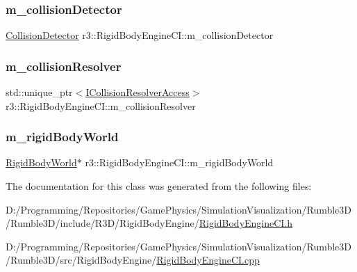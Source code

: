 \subsubsection{\texorpdfstring{m\+\_\+collision\+Detector}{m\_collisionDetector}}
{\footnotesize\ttfamily \mbox{\hyperlink{classr3_1_1_collision_detector}{Collision\+Detector}} r3\+::\+Rigid\+Body\+Engine\+C\+I\+::m\+\_\+collision\+Detector\hspace{0.3cm}{\ttfamily [protected]}}

\mbox{\label{classr3_1_1_rigid_body_engine_c_i_a27f09a82ab77919c2fb78869f6d3c035}} 
\subsubsection{\texorpdfstring{m\+\_\+collision\+Resolver}{m\_collisionResolver}}
{\footnotesize\ttfamily std\+::unique\+\_\+ptr$<$\mbox{\hyperlink{classr3_1_1_i_collision_resolver_access}{I\+Collision\+Resolver\+Access}}$>$ r3\+::\+Rigid\+Body\+Engine\+C\+I\+::m\+\_\+collision\+Resolver\hspace{0.3cm}{\ttfamily [protected]}}

\mbox{\label{classr3_1_1_rigid_body_engine_c_i_afd7ae3fcba8b88ec6c31f2df56aae3f6}} 
\subsubsection{\texorpdfstring{m\+\_\+rigid\+Body\+World}{m\_rigidBodyWorld}}
{\footnotesize\ttfamily \mbox{\hyperlink{classr3_1_1_rigid_body_world}{Rigid\+Body\+World}}$\ast$ r3\+::\+Rigid\+Body\+Engine\+C\+I\+::m\+\_\+rigid\+Body\+World\hspace{0.3cm}{\ttfamily [protected]}}



The documentation for this class was generated from the following files\+:\begin{DoxyCompactItemize}
\item 
D\+:/\+Programming/\+Repositories/\+Game\+Physics/\+Simulation\+Visualization/\+Rumble3\+D/\+Rumble3\+D/include/\+R3\+D/\+Rigid\+Body\+Engine/\mbox{\hyperlink{_rigid_body_engine_c_i_8h}{Rigid\+Body\+Engine\+C\+I.\+h}}\item 
D\+:/\+Programming/\+Repositories/\+Game\+Physics/\+Simulation\+Visualization/\+Rumble3\+D/\+Rumble3\+D/src/\+Rigid\+Body\+Engine/\mbox{\hyperlink{_rigid_body_engine_c_i_8cpp}{Rigid\+Body\+Engine\+C\+I.\+cpp}}\end{DoxyCompactItemize}
